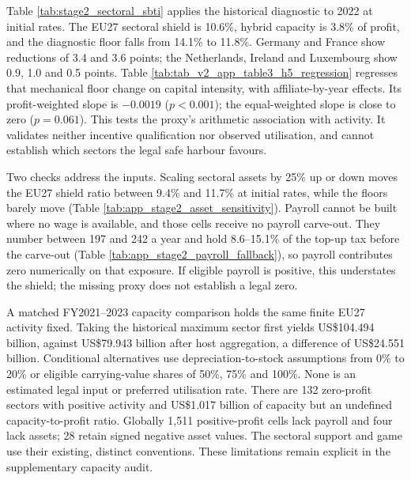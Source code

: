 \documentclass[11pt,a4paper]{article}
\newcommand{\usd}{US\$}
\begin{document}
Table \ref{tab:stage2_sectoral_sbti} applies the historical diagnostic to 2022 at initial rates. The EU27 sectoral shield is 10.6\%, hybrid capacity is 3.8\% of profit, and the diagnostic floor falls from 14.1\% to 11.8\%. Germany and France show reductions of 3.4 and 3.6 points; the Netherlands, Ireland and Luxembourg show 0.9, 1.0 and 0.5 points. Table \ref{tab:tab_v2_app_table3_h5_regression} regresses that mechanical floor change on capital intensity, with affiliate-by-year effects. Its profit-weighted slope is $-0.0019$ ($p<0.001$); the equal-weighted slope is close to zero ($p=0.061$). This tests the proxy's arithmetic association with activity. It validates neither incentive qualification nor observed utilisation, and cannot establish which sectors the legal safe harbour favours.





Two checks address the inputs. Scaling sectoral assets by 25\% up or down moves the EU27 shield ratio between 9.4\% and 11.7\% at initial rates, while the floors barely move (Table \ref{tab:app_stage2_asset_sensitivity}). Payroll cannot be built where no wage is available, and those cells receive no payroll carve-out. They number between 197 and 242 a year and hold 8.6–15.1\% of the top-up tax before the carve-out (Table \ref{tab:app_stage2_payroll_fallback}), so payroll contributes zero numerically on that exposure. If eligible payroll is positive, this understates the shield; the missing proxy does not establish a legal zero.

A matched FY2021–2023 capacity comparison holds the same finite EU27 activity fixed. Taking the historical maximum sector first yields \usd104.494 billion, against \usd79.943 billion after host aggregation, a difference of \usd24.551 billion. Conditional alternatives use depreciation-to-stock assumptions from 0\% to 20\% or eligible carrying-value shares of 50\%, 75\% and 100\%. None is an estimated legal input or preferred utilisation rate. There are 132 zero-profit sectors with positive activity and \usd1.017 billion of capacity but an undefined capacity-to-profit ratio. Globally 1,511 positive-profit cells lack payroll and four lack assets; 28 retain signed negative asset values. The sectoral support and game use their existing, distinct conventions. These limitations remain explicit in the supplementary capacity audit.
\end{document}
